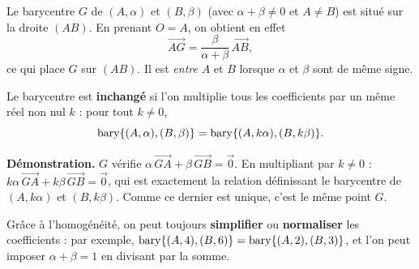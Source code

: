 \begin{propriete}
Le barycentre $G$ de $(A,\alpha)$ et $(B,\beta)$ (avec $\alpha+\beta\neq0$ et
$A\neq B$) est situé sur la droite $(AB)$. En prenant $O=A$, on obtient en effet
\[ \vec{AG}=\frac{\beta}{\alpha+\beta}\,\vec{AB}, \]
ce qui place $G$ sur $(AB)$. Il est \emph{entre} $A$ et $B$ lorsque $\alpha$ et
$\beta$ sont de même signe.
\end{propriete}

\begin{illus}
\end{illus}

\begin{propriete}[Homogénéité]
Le barycentre est \textbf{inchangé} si l'on multiplie tous les coefficients par un même
réel non nul $k$ : pour tout $k\neq 0$,
\[ \operatorname{bary}\{(A,\alpha),(B,\beta)\}=\operatorname{bary}\{(A,k\alpha),(B,k\beta)\}. \]
\end{propriete}

\begin{remarque}
\textbf{Démonstration.} $G$ vérifie $\alpha\,\vec{GA}+\beta\,\vec{GB}=\vec{0}$. En
multipliant par $k\neq0$ : $k\alpha\,\vec{GA}+k\beta\,\vec{GB}=\vec{0}$, qui est
exactement la relation définissant le barycentre de $(A,k\alpha)$ et $(B,k\beta)$.
Comme ce dernier est unique, c'est le même point $G$.
\end{remarque}

\begin{aretenir}
Grâce à l'homogénéité, on peut toujours \textbf{simplifier} ou \textbf{normaliser}
les coefficients : par exemple, $\operatorname{bary}\{(A,4),(B,6)\}=\operatorname{bary}\{(A,2),(B,3)\}$, et l'on
peut imposer $\alpha+\beta=1$ en divisant par la somme.
\end{aretenir}

